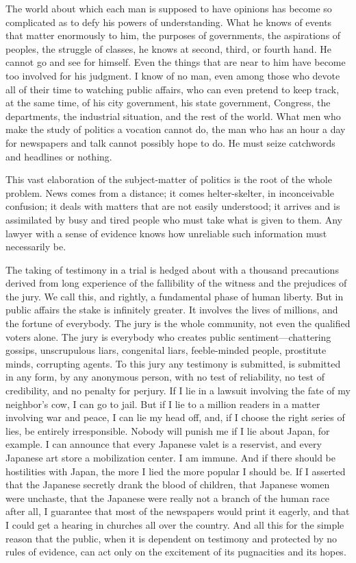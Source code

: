 \documentclass[openany,nobib,twoside,nohyper]{tufte-book}
\begin{document}
The world about which each man is supposed to have opinions has become
so complicated as to defy his powers of understanding. What he knows of
events that matter enormously to him, the purposes of governments, the
aspirations of peoples, the struggle of classes, he knows at second,
third, or fourth hand. He cannot go and see for himself. Even the things
that are near to him have become too involved for his judgment. I know
of no man, even among those who devote all of their time to watching
public affairs, who can even pretend to keep track, at the same time, of
his city government, his state government, Congress, the departments,
the industrial situation, and the rest of the world. What men who make
the study of politics a vocation cannot do, the man who has an hour a
day for newspapers and talk cannot possibly hope to do. He must seize
catchwords and headlines or nothing.

\clearpage
This vast elaboration of the subject-matter of politics is the root of
the whole problem. News comes from a distance; it comes helter-skelter,
in inconceivable confusion; it deals with matters that are not easily
understood; it arrives and is assimilated by busy and tired people who
must take what is given to them. Any lawyer with a sense of evidence
knows how unreliable such information must necessarily be.

The taking of testimony in a trial is hedged about with a thousand
precautions derived from long experience of the fallibility of the
witness and the prejudices of the jury. We call this, and rightly, a
fundamental phase of human liberty. But in public affairs the stake is
infinitely greater. It involves the lives of millions, and the fortune
of everybody. The jury is the whole community, not even the qualified
voters alone. The jury is everybody who creates public
sentiment---chattering gossips, unscrupulous liars, congenital liars,
feeble-minded people, prostitute minds, corrupting agents. To this jury
any testimony is submitted, is submitted in any form, by any anonymous
person, with no test of reliability, no test of credibility, and no
penalty for perjury. If I lie in a lawsuit involving the fate of my
neighbor's cow, I can go to jail. But if I lie to a million readers in a
matter involving war and peace, I can lie my head off, and, if I choose
the right series of lies, be entirely irresponsible. Nobody will punish
me if I lie about Japan, for example. I can announce that every Japanese
valet is a reservist, and every Japanese art store a mobilization
center. I am immune. And if there should be hostilities with Japan, the
more I lied the more popular I should be. If I asserted that the
Japanese secretly drank the blood of children, that Japanese women were
unchaste, that the Japanese were really not a branch of the human race
after all, I guarantee that most of the newspapers would print it
eagerly, and that I could get a hearing in churches all over the
country. And all this for the simple reason that the public, when it is
dependent on testimony and protected by no rules of evidence, can act
only on the excitement of its pugnacities and its hopes.
\end{document}
